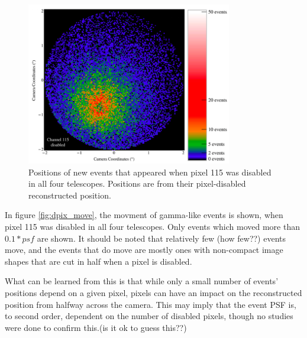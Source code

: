 \begin{figure}[ht]
  \begin{center}
    \includegraphics[width=0.8\textwidth]{images/disabled_pixel/appearing_events}
    \caption[Newly Appearing Events]{Positions of new events that appeared when pixel 115 was disabled in all four telescopes.  Positions are from their pixel-disabled reconstructed position.}\label{fig:dpix_appear}
  \end{center}
\end{figure}

In figure \ref{fig:dpix_move}, the movment of gamma-like events is shown, when pixel 115 was disabled in all four telescopes.
Only events which moved more than $0.1*psf$ are shown.
It should be noted that relatively few (how few??) events move, and the events that do move are mostly ones with non-compact image shapes that are cut in half when a pixel is disabled.

What can be learned from this is that while only a small number of events' positions depend on a given pixel, pixels can have an impact on the reconstructed position from halfway across the camera.
This may imply that the event PSF is, to second order, dependent on the number of disabled pixels, though no studies were done to confirm this.(is it ok to guess this??)


